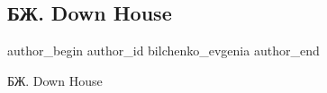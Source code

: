  
 
 
 
 
 
\subsection{БЖ. Down House}
\label{sec:04_07_2021.fb.bilchenko_evgenia.3.down_house}
\ifcmt
 author_begin
   author_id bilchenko_evgenia
 author_end
\fi

БЖ. Down House

